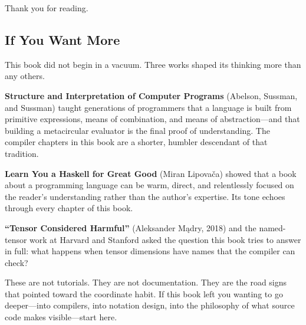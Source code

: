\documentclass[11pt,titlepage]{article}
\begin{document}
Thank you for reading.

\vspace{2em}

\hypertarget{if-you-want-more}{%
\subsection{If You Want More}\label{if-you-want-more}}

This book did not begin in a vacuum. Three works shaped its thinking
more than any others.

\textbf{Structure and Interpretation of Computer Programs} (Abelson,
Sussman, and Sussman) taught generations of programmers that a language
is built from primitive expressions, means of combination, and means of
abstraction---and that building a metacircular evaluator is the final
proof of understanding. The compiler chapters in this book are a
shorter, humbler descendant of that tradition.

\textbf{Learn You a Haskell for Great Good} (Miran Lipovača) showed that
a book about a programming language can be warm, direct, and
relentlessly focused on the reader's understanding rather than the
author's expertise. Its tone echoes through every chapter of this book.

\textbf{``Tensor Considered Harmful''} (Aleksander Mądry, 2018) and the
named-tensor work at Harvard and Stanford asked the question this book
tries to answer in full: what happens when tensor dimensions have names
that the compiler can check?

These are not tutorials. They are not documentation. They are the road
signs that pointed toward the coordinate habit. If this book left you
wanting to go deeper---into compilers, into notation design, into the
philosophy of what source code makes visible---start here.
\end{document}
